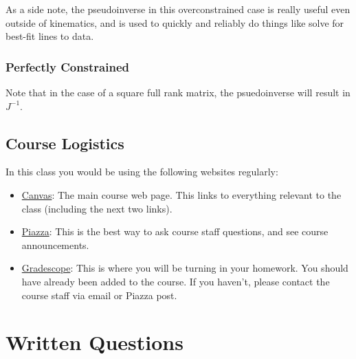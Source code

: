 \documentclass{16384_doc} %
\begin{document}
As a side note, the pseudoinverse in this overconstrained case is really useful
even outside of kinematics, and is used to quickly and reliably do things like
solve for best-fit lines to data.

\subsubsection{Perfectly Constrained}
Note that in the case of a square full rank matrix, the psuedoinverse will
result in $J^{-1}$.

\subsection{Course Logistics}

In this class you would be using the following websites regularly:
\begin{itemize}
    \item \href{https://canvas.cmu.edu/courses/42018}{Canvas}: The main course web page. This links to everything relevant to the class (including the next two links).
    \item \href{https://piazza.com/class/m09xl90abke42b}{Piazza}: This is the best way to ask course staff questions, and see course announcements.
    \item \href{https://www.gradescope.com/courses/820155/assignments/4876306/submissions}{Gradescope}: This is where you will be turning in your homework. You should have already been added to the course. If you haven't, please contact the course staff via email or Piazza post.
\end{itemize}    

\writtenSection

\section{Written Questions}
\end{document}
